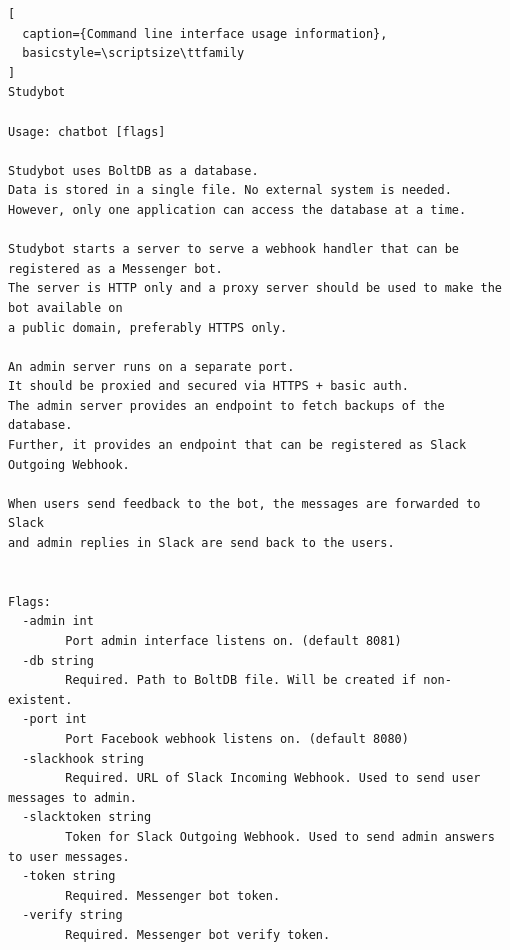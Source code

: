 \begin{lstlisting}[
  caption={Command line interface usage information},
  basicstyle=\scriptsize\ttfamily
]
Studybot

Usage: chatbot [flags]

Studybot uses BoltDB as a database.
Data is stored in a single file. No external system is needed.
However, only one application can access the database at a time.

Studybot starts a server to serve a webhook handler that can be registered as a Messenger bot.
The server is HTTP only and a proxy server should be used to make the bot available on
a public domain, preferably HTTPS only.

An admin server runs on a separate port.
It should be proxied and secured via HTTPS + basic auth.
The admin server provides an endpoint to fetch backups of the database.
Further, it provides an endpoint that can be registered as Slack Outgoing Webhook.

When users send feedback to the bot, the messages are forwarded to Slack
and admin replies in Slack are send back to the users.


Flags:
  -admin int
    	Port admin interface listens on. (default 8081)
  -db string
    	Required. Path to BoltDB file. Will be created if non-existent.
  -port int
    	Port Facebook webhook listens on. (default 8080)
  -slackhook string
    	Required. URL of Slack Incoming Webhook. Used to send user messages to admin.
  -slacktoken string
    	Token for Slack Outgoing Webhook. Used to send admin answers to user messages.
  -token string
    	Required. Messenger bot token.
  -verify string
    	Required. Messenger bot verify token.
\end{lstlisting}


